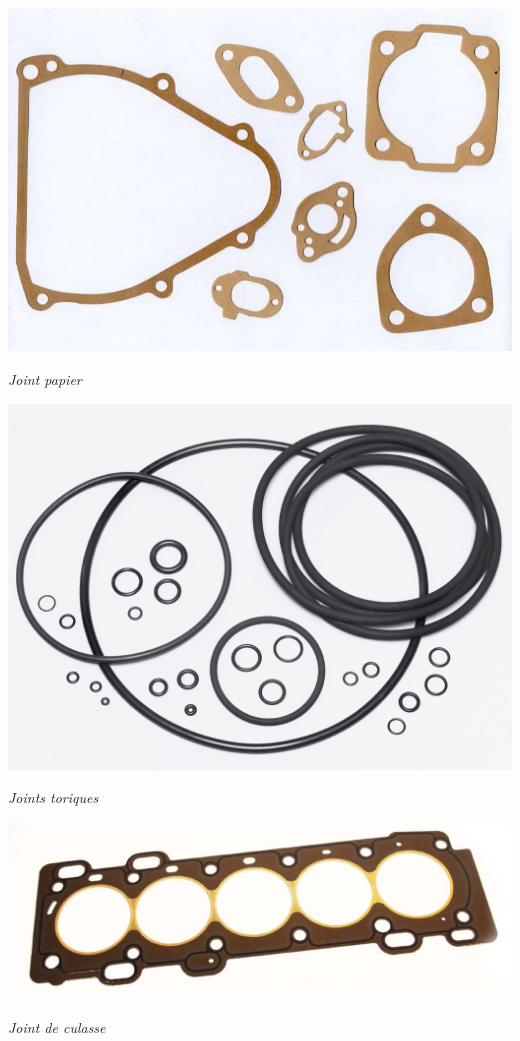 \documentclass[11pt,oneside]{article}
\begin{document}
\noindent\begin{minipage}[c]{.3\linewidth}
\begin{center}
\includegraphics[width=.9\textwidth]{png/papier}

\textit{Joint papier \cite{papier}}
\end{center}
\end{minipage}\hfill
\begin{minipage}[c]{.3\linewidth}
\begin{center}
\includegraphics[width=.9\textwidth]{png/torique}

\textit{Joints toriques \cite{torique}}
\end{center}
\end{minipage}\hfill
\begin{minipage}[c]{.3\linewidth}
\begin{center}
\includegraphics[width=.9\textwidth]{png/culasse}

\textit{Joint de culasse \cite{culasse}}
\end{center}
\end{minipage}
\end{document}
